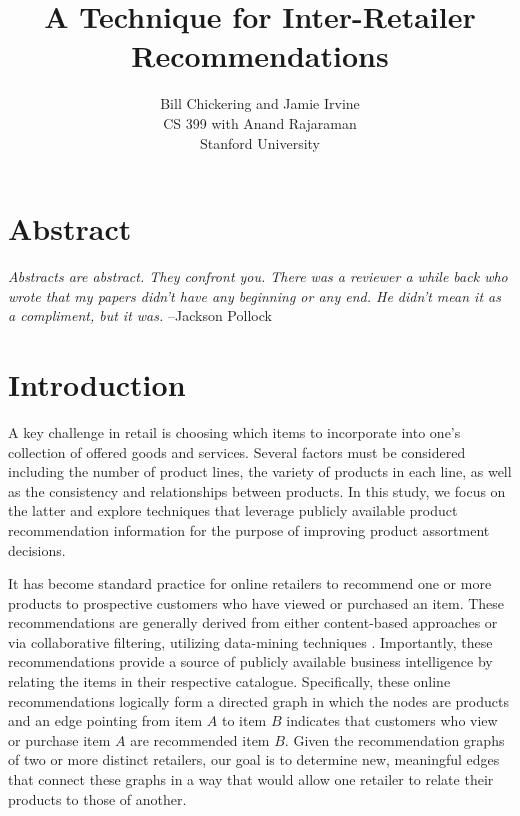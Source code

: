 \documentclass[11pt]{article}
\begin{document}

\title{A Technique for Inter-Retailer Recommendations}
\author{Bill Chickering and Jamie Irvine\\
CS 399 with Anand Rajaraman\\
Stanford University}
\renewcommand{\today}{June 11, 2014}
\maketitle

\section*{Abstract}
\emph{Abstracts are abstract. They confront you. There was a reviewer a
while back who wrote that my papers didn't have any beginning or any end. He
didn't mean it as a compliment, but it was.} --Jackson Pollock

\section*{Introduction}
A key challenge in retail is choosing which items to incorporate into one's
collection of offered goods and services.  Several factors must be considered
including the number of product lines, the variety of products in each line, as
well as the consistency and relationships between products. In this study, we
focus on the latter and explore techniques that leverage publicly available
product recommendation information for the purpose of improving product
assortment decisions.

It has become standard practice for online retailers to recommend one or more
products to prospective customers who have viewed or purchased an item. These
recommendations are generally derived from either content-based approaches or
via collaborative filtering, utilizing data-mining techniques \cite{Ricci2011}.
Importantly, these recommendations provide a source of publicly available
business intelligence by relating the items in their respective catalogue.
Specifically, these online recommendations logically form a directed graph in
which the nodes are products and an edge pointing from item $A$ to item $B$
indicates that customers who view or purchase item $A$ are recommended item $B$.
Given the recommendation graphs of two or more distinct retailers, our goal is
to determine new, meaningful edges that connect these graphs in a way that would
allow one retailer to relate their products to those of another.
\end{document}
